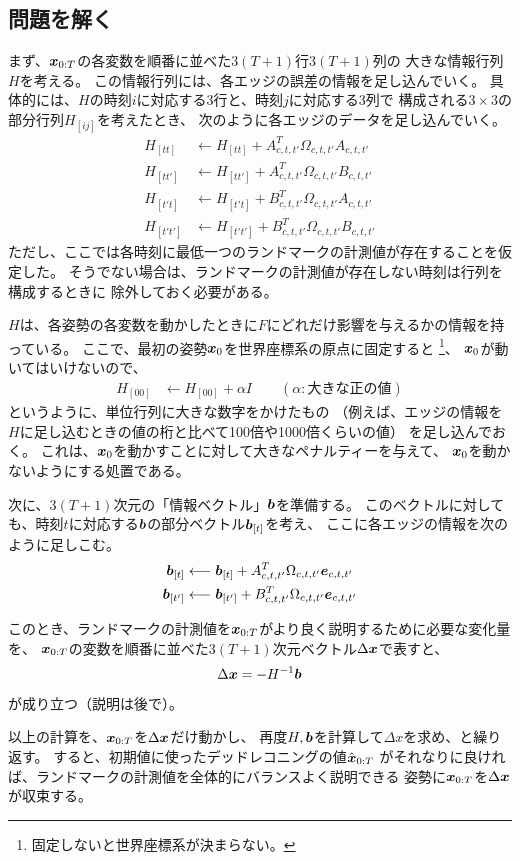 \subsection{問題を解く}


まず、$\boldsymbol{x}_{0:T}$の各変数を順番に並べた$3(T+1)$行$3(T+1)$列の
大きな情報行列$H$を考える。
この情報行列には、各エッジの誤差の情報を足し込んでいく。
具体的には、$H$の時刻$i$に対応する3行と、時刻$j$に対応する3列で
構成される$3\times3$の部分行列$H_{[ij]}$を考えたとき、
次のように各エッジのデータを足し込んでいく。
\begin{align}
	H_{[tt]} &\longleftarrow H_{[tt]} + A_{c,t,t'}^T \Omega_{c,t,t'} A_{c,t,t'} \\
	H_{[tt']} &\longleftarrow H_{[tt']} + A_{c,t,t'}^T \Omega_{c,t,t'} B_{c,t,t'} \\
	H_{[t't]} &\longleftarrow H_{[t't]} + B_{c,t,t'}^T \Omega_{c,t,t'} A_{c,t,t'} \\
	H_{[t't']} &\longleftarrow H_{[t't']} + B_{c,t,t'}^T \Omega_{c,t,t'} B_{c,t,t'}
\end{align}
ただし、ここでは各時刻に最低一つのランドマークの計測値が存在することを仮定した。
そうでない場合は、ランドマークの計測値が存在しない時刻は行列を構成するときに
除外しておく必要がある。

$H$は、各姿勢の各変数を動かしたときに$F$にどれだけ影響を与えるかの情報を持っている。
ここで、最初の姿勢$\boldsymbol{x}_0$を世界座標系の原点に固定すると
\footnote{固定しないと世界座標系が決まらない。}、
$\boldsymbol{x}_0$が動いてはいけないので、
\begin{align}
	H_{[00]} &\longleftarrow H_{[00]} + \alpha I \qquad (\alpha: \text{大きな正の値})
\end{align}
というように、単位行列に大きな数字をかけたもの
（例えば、エッジの情報を$H$に足し込むときの値の桁と比べて100倍や1000倍くらいの値）
を足し込んでおく。
これは、$\boldsymbol{x}_0$を動かすことに対して大きなペナルティーを与えて、
$\boldsymbol{x}_0$を動かないようにする処置である。



次に、$3(T+1)$次元の「情報ベクトル」$\boldsymbol{b}$を準備する。
このベクトルに対しても、時刻$t$に対応する$\boldsymbol{b}$の部分ベクトル$\boldsymbol{b}_{[t]}$を考え、
ここに各エッジの情報を次のように足しこむ。
\begin{align}
	\boldsymbol{b}_{[t]} &\longleftarrow \boldsymbol{b}_{[t]} + A_{c,t,t'}^T \Omega_{c,t,t'} \boldsymbol{e}_{c,t,t'} \\
	\boldsymbol{b}_{[t']} &\longleftarrow \boldsymbol{b}_{[t']} + B_{c,t,t'}^T \Omega_{c,t,t'} \boldsymbol{e}_{c,t,t'} 
\end{align}


このとき、ランドマークの計測値を$\boldsymbol{x}_{0:T}$がより良く説明するために必要な変化量を、
$\boldsymbol{x}_{0:T}$の変数を順番に並べた$3(T+1)$次元ベクトル$\Delta\boldsymbol{x}$で表すと、
\begin{align}
	\Delta\boldsymbol{x} = - H^{-1}\boldsymbol{b}
\end{align}
が成り立つ（説明は後で）。

以上の計算を、$\boldsymbol{x}_{0:T}$を$\Delta\boldsymbol{x}$だけ動かし、
再度$H, \boldsymbol{b}$を計算して$\Delta{x}$を求め、と繰り返す。
すると、初期値に使ったデッドレコニングの値$\hat{\boldsymbol{x}}_{0:T}$
がそれなりに良ければ、ランドマークの計測値を全体的にバランスよく説明できる
姿勢に$\boldsymbol{x}_{0:T}$を$\Delta\boldsymbol{x}$が収束する。

